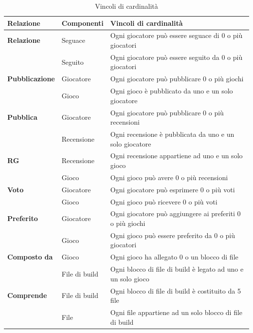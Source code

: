 \begin{table}[hbt!]
    \centering
    \begin{tabular}{m{} m{} m{}}
        \hline
        \textbf{Relazione} & \textbf{Componenti} & \textbf{Vincoli di cardinalità}\\ \hline
        \textbf{Relazione} & Seguace & Ogni giocatore può essere seguace di 0 o più giocatori \\ \cline{2-3}
        & Seguito & Ogni giocatore può essere seguito da 0 o più giocatori \\ \hline
        \textbf{Pubblicazione} & Giocatore & Ogni giocatore può pubblicare 0 o più giochi \\ \cline{2-3}
        & Gioco & Ogni gioco è pubblicato da uno e un solo giocatore \\ \hline
        \textbf{Pubblica} & Giocatore & Ogni giocatore può pubblicare 0 o più recensioni \\ \cline{2-3}
        & Recensione & Ogni recensione è pubblicata da uno e un solo giocatore \\ \hline
        \textbf{RG} & Recensione & Ogni recensione appartiene ad uno e un solo gioco \\ \cline{2-3}
        & Gioco & Ogni gioco può avere 0 o più recensioni \\ \hline
        \textbf{Voto} & Giocatore & Ogni giocatore può esprimere 0 o più voti \\ \cline{2-3}
        & Gioco & Ogni gioco può ricevere 0 o più voti \\ \hline
        \textbf{Preferito} & Giocatore & Ogni giocatore può aggiungere ai preferiti 0 o più giochi \\ \cline{2-3}
        & Gioco & Ogni gioco può essere preferito da 0 o più giocatori \\ \hline
        \textbf{Composto da} & Gioco & Ogni gioco ha allegato 0 o un blocco di file \\ \cline{2-3}
        & File di build & Ogni blocco di file di build è legato ad uno e un solo gioco \\ \hline
        \textbf{Comprende} & File di build & Ogni blocco di file di build è costituito da 5 file \\ \cline{2-3}
        & File & Ogni file appartiene ad un solo blocco di file di build \\
    \end{tabular}
    \caption{Vincoli di cardinalità}
\end{table}

